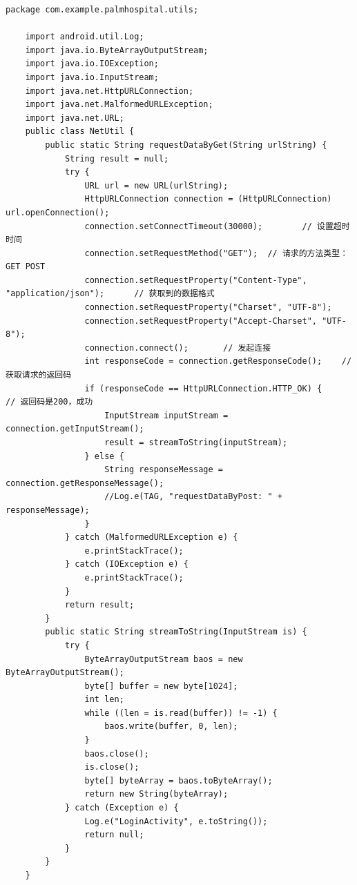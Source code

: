 \documentclass[UTF8,12pt]{article}
\begin{document}
\begin{lstlisting}[frame=shadowbox]
    package com.example.palmhospital.utils;

    import android.util.Log;
    import java.io.ByteArrayOutputStream;
    import java.io.IOException;
    import java.io.InputStream;
    import java.net.HttpURLConnection;
    import java.net.MalformedURLException;
    import java.net.URL;
    public class NetUtil {
        public static String requestDataByGet(String urlString) {
            String result = null;
            try {
                URL url = new URL(urlString);
                HttpURLConnection connection = (HttpURLConnection) url.openConnection();
                connection.setConnectTimeout(30000);        // 设置超时时间
                connection.setRequestMethod("GET");  // 请求的方法类型：GET POST
                connection.setRequestProperty("Content-Type", "application/json");      // 获取到的数据格式
                connection.setRequestProperty("Charset", "UTF-8");
                connection.setRequestProperty("Accept-Charset", "UTF-8");
                connection.connect();       // 发起连接
                int responseCode = connection.getResponseCode();    // 获取请求的返回码
                if (responseCode == HttpURLConnection.HTTP_OK) {        // 返回码是200，成功
                    InputStream inputStream = connection.getInputStream();
                    result = streamToString(inputStream);
                } else {
                    String responseMessage = connection.getResponseMessage();
                    //Log.e(TAG, "requestDataByPost: " + responseMessage);
                }
            } catch (MalformedURLException e) {
                e.printStackTrace();
            } catch (IOException e) {
                e.printStackTrace();
            }
            return result;
        }
        public static String streamToString(InputStream is) {
            try {
                ByteArrayOutputStream baos = new ByteArrayOutputStream();
                byte[] buffer = new byte[1024];
                int len;
                while ((len = is.read(buffer)) != -1) {
                    baos.write(buffer, 0, len);
                }
                baos.close();
                is.close();
                byte[] byteArray = baos.toByteArray();
                return new String(byteArray);
            } catch (Exception e) {
                Log.e("LoginActivity", e.toString());
                return null;
            }
        }
    }    
\end{lstlisting}
\end{document}
